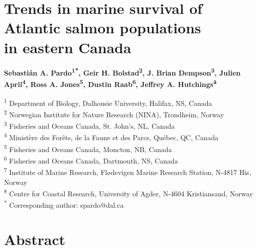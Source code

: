 \documentclass[12pt]{article}
\providecommand{\DIFaddtex}[1]{{\protect\color{blue}\uwave{#1}}} %
\providecommand{\DIFdeltex}[1]{{\protect\color{red}\sout{#1}}}                      %
\providecommand{\DIFaddbegin}{} %
\providecommand{\DIFaddend}{} %
\providecommand{\DIFdelbegin}{} %
\providecommand{\DIFdelend}{} %
\providecommand{\DIFadd}[1]{\texorpdfstring{\DIFaddtex{#1}}{#1}} %
\providecommand{\DIFdel}[1]{\texorpdfstring{\DIFdeltex{#1}}{}} %
\begin{document}
\linenumbers


\section*{Trends in marine survival of Atlantic salmon populations \\ in eastern Canada}

\textbf{Sebasti\'{a}n A. Pardo\textsuperscript{1*},
        Geir H. Bolstad\textsuperscript{2},
        J. Brian Dempson\textsuperscript{3},
        Julien April\textsuperscript{4},
        Ross A. Jones\textsuperscript{5},
        Dustin Raab\textsuperscript{6},
Jeffrey A. Hutchings\DIFdelbegin \DIFdel{\textsuperscript{1}}\DIFdelend \DIFaddbegin \DIFadd{\textsuperscript{1,7,8}}\DIFaddend }

\noindent\small{\textsuperscript{1} Department of Biology, Dalhousie University, Halifax, NS, Canada\\}
\small{\textsuperscript{2} Norwegian Institute for Nature Research (NINA), Trondheim, Norway\\}
\small{\textsuperscript{3} Fisheries and Oceans Canada, St. John's, NL, Canada\\}
\small{\textsuperscript{4} Minist\`{e}re des For\^{e}ts, de la Faune et des Parcs, Qu\'{e}bec, QC, Canada\\}
\small{\textsuperscript{5} Fisheries and Oceans Canada, Moncton, NB, Canada\\}
\small{\textsuperscript{6} Fisheries and Oceans Canada, Dartmouth, NS, Canada\\}
\DIFaddbegin \small{\textsuperscript{7} Institute of Marine Research, Flødevigen Marine Research Station, N-4817 His, Norway\\}
\small{\textsuperscript{8} Centre for Coastal Research, University of Agder, N-4604 Kristiansand, Norway\\}
\DIFaddend \small{\textsuperscript{*} Corresponding author: spardo@dal.ca}

\section*{Abstract}
\end{document}
